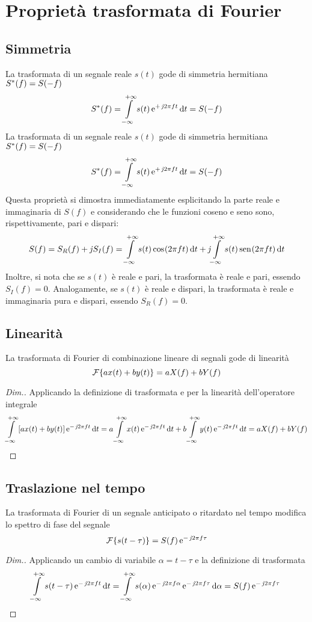 \section{Proprietà trasformata di Fourier}
\subsection{Simmetria}
La trasformata di un segnale reale $s(t)$ gode di simmetria hermitiana ${S}^\ast(f)=S(-f)$
\begin{equation}{S}^\ast(f)=\int\limits_{-\infty}^{+\infty}{s(t)\operatorname{e}^{+\operatorname{\mathit{j}\!} 2\pi f t}}{\,\mathop{}\!\mathrm{d}{t}}=S(-f)\end{equation}
La trasformata di un segnale reale $s(t)$ gode di simmetria hermitiana ${S}^\ast(f)=S(-f)$
\begin{equation}{S}^\ast(f)=\int\limits_{-\infty}^{+\infty}{s(t)\operatorname{e}^{+\operatorname{\mathit{j}\!} 2\pi f t}}{\,\mathop{}\!\mathrm{d}{t}}=S(-f)\end{equation}
Questa proprietà si dimostra immediatamente esplicitando la parte reale e immaginaria di $S(f)$ e considerando che le funzioni coseno e seno sono, rispettivamente, pari e dispari: 
\[S(f)=S_R(f)+\operatorname{\mathit{j}\!} S_I(f)=\int\limits_{-\infty}^{+\infty}{s(t)\,{\operatorname{cos}}^{}\!\left({2\pi f t}\right)}{\,\mathop{}\!\mathrm{d}{t}}+\operatorname{\mathit{j}\!}\int\limits_{-\infty}^{+\infty}{s(t)\,{\operatorname{sen}}^{}\!\left({2\pi f t}\right)}{\,\mathop{}\!\mathrm{d}{t}}\]
Inoltre, si nota che se $s(t)$ è reale e pari, la trasformata è reale e pari, essendo $S_I(f)=0$.
Analogamente, se $s(t)$ è reale e dispari, la trasformata è reale e immaginaria pura e dispari, essendo $S_R(f)=0$.

\subsection{Linearità}
La trasformata di Fourier di combinazione lineare di segnali gode di linearità
\begin{equation}
\operatorname{\mathcal{F}}\!\left\lbrace{a x(t)+ b y(t)}\right\rbrace= a X(f)+ b Y(f)
\end{equation}

\begin{proof}[Dim.]
Applicando la definizione di trasformata e per la linearità dell'operatore integrale
\[ \int\limits_{-\infty}^{+\infty}{\left[a x(t)+ b y(t)\right]\operatorname{e}^{-\operatorname{\mathit{j}\!} 2\pi f t}}{\,\mathop{}\!\mathrm{d}{t}}= a\int\limits_{-\infty}^{+\infty}{x(t)\operatorname{e}^{-\operatorname{\mathit{j}\!} 2\pi f t}}{\,\mathop{}\!\mathrm{d}{t}} + b\int\limits_{-\infty}^{+\infty}{y(t)\operatorname{e}^{-\operatorname{\mathit{j}\!} 2\pi f t}}{\,\mathop{}\!\mathrm{d}{t}}= a X(f) + b Y(f)\qedhere\]
\end{proof}

\subsection{Traslazione nel tempo}
La trasformata di Fourier di un segnale anticipato o ritardato nel tempo modifica lo spettro di fase del segnale
\begin{equation}
\fourier{s(t-\tau)}= S(f)\e{-\imath 2\pi f \tau}
\label{eq:trasf_Fourier_trasl}
\end{equation}
\begin{proof}[Dim.]
Applicando un cambio di variabile $\alpha=t-\tau$ e la definizione di trasformata
\[\int\limits_{-\infty}^{+\infty}{s(t-\tau)\operatorname{e}^{-\operatorname{\mathit{j}\!} 2\pi f t}}{\,\mathop{}\!\mathrm{d}{t}}=
\int\limits_{-\infty}^{+\infty}{s(\alpha)\operatorname{e}^{-\operatorname{\mathit{j}\!} 2\pi f\alpha}\operatorname{e}^{-\operatorname{\mathit{j}\!} 2\pi f\tau}}{\,\mathop{}\!\mathrm{d}{\alpha}}=S(f)\operatorname{e}^{-\operatorname{\mathit{j}\!} 2\pi f\tau}\qedhere\]
\end{proof}

